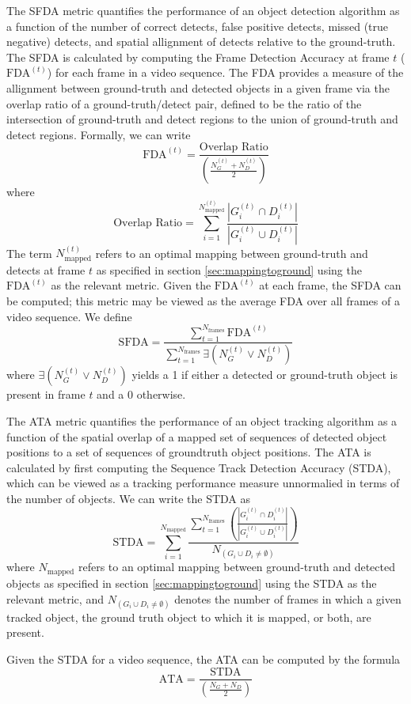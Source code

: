 \documentclass[twocolumn, final]{svjour3}
\begin{document}
The SFDA metric quantifies the performance of an object detection algorithm as a function of the number of correct detects, false positive detects, missed (true negative) detects, and spatial allignment of detects relative to the ground-truth. The SFDA is calculated by computing the Frame Detection Accuracy at frame $t$ ($\text{FDA}^{(t)}$) for each frame in a video sequence. The FDA provides a measure of the allignment between ground-truth and detected objects in a given frame via the overlap ratio of a ground-truth/detect pair, defined to be the ratio of the intersection of ground-truth and detect regions to the union of ground-truth and detect regions. Formally, we can write
\begin{equation}
\text{FDA}^{(t)} = \frac{\text{Overlap Ratio}}{\left(\frac{N_{G}^{(t)} + N_{D}^{(t)}}{2}\right)}
\end{equation}
where
\begin{equation}
\text{Overlap Ratio} = \sum_{i = 1}^{N_{\text{mapped}}^{(t)}} \frac{\left|G_{i}^{(t)} \cap D_{i}^{(t)}\right|}{\left|G_{i}^{(t)} \cup D_{i}^{(t)}\right|}
\end{equation}
The term $N_{\text{mapped}}^{(t)}$ refers to an optimal mapping between ground-truth and detects at frame $t$ as specified in section \ref{sec:mappingtoground} using the $\text{FDA}^{(t)}$ as the relevant metric. Given the $\text{FDA}^{(t)}$ at each frame, the SFDA can be computed; this metric may be viewed as the average FDA over all frames of a video sequence. We define
\begin{equation}
\text{SFDA} = \frac{\sum_{t=1}^{N_{\text{frames}}} \text{FDA}^{(t)}}{\sum_{t=1}^{N_{\text{frames}}} \exists \left( N_{G}^{(t)} \vee N_{D}^{(t)} \right)}
\end{equation}
where $\exists \left( N_{G}^{(t)} \vee N_{D}^{(t)} \right)$ yields a 1 if either a detected or ground-truth object is present in frame $t$ and a 0 otherwise.

The ATA metric quantifies the performance of an object tracking algorithm as a function of the spatial overlap of a mapped set of sequences of detected object positions to a set of sequences of groundtruth object positions. The ATA is calculated by first computing the Sequence Track Detection Accuracy (STDA), which can be viewed as a tracking performance measure unnormalied in terms of the number of objects. We can write the STDA as
\begin{equation}
\text{STDA} = \sum_{i=1}^{N_{\text{mapped}}} \frac{\sum_{t=1}^{N_{\text{frames}}} \left( \frac{\left|G_{i}^{(t)} \cap D_{i}^{(t)}\right|}{\left|G_{i}^{(t)} \cup D_{i}^{(t)}\right|}  \right) }{ N_{(G_{i} \cup D_{i} \neq \emptyset)} }
\end{equation}
where $N_{\text{mapped}}$ refers to an optimal mapping between ground-truth and detected objects as specified in section \ref{sec:mappingtoground} using the STDA as the relevant metric, and $N_{(G_{i} \cup D_{i} \neq \emptyset)}$ denotes the number of frames in which a given tracked object, the ground truth object to which it is mapped, or both, are present.

Given the STDA for a video sequence, the ATA can be computed by the formula
\begin{equation}
\text{ATA} = \frac{\text{STDA}}{\left( \frac{N_{G} + N_{D}}{2} \right)}
\end{equation}
\end{document}
